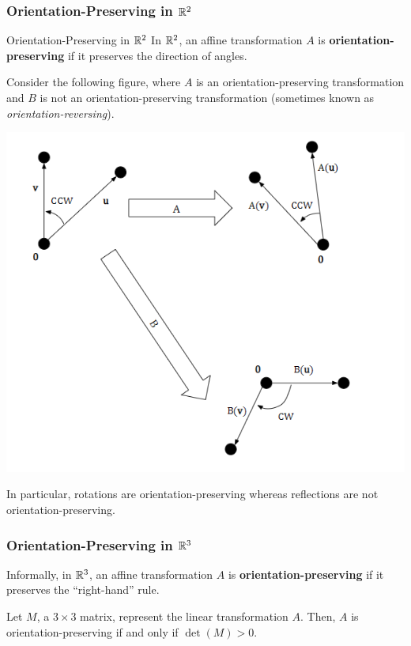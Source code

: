 \documentclass[letterpaper]{article}
\begin{document}
\subsubsection{Orientation-Preserving in \texorpdfstring{$\mathbb{R}^2$}{Two-Dimensions}}
\begin{definition}{Orientation-Preserving in $\mathbb{R}^2$}{}
    In $\mathbb{R}^2$, an affine transformation $A$ is \textbf{orientation-preserving} if it preserves the direction of angles. 
\end{definition}
Consider the following figure, where $A$ is an orientation-preserving transformation and $B$ is not an orientation-preserving transformation (sometimes known as \emph{orientation-reversing}).
\begin{center}
    \includegraphics[scale=0.8]{../assets/orientation.png}
\end{center}
In particular, rotations are orientation-preserving whereas reflections are not orientation-preserving.

\subsubsection{Orientation-Preserving in \texorpdfstring{$\mathbb{R}^3$}{Three-Dimensions}}
Informally, in $\mathbb{R}^3$, an affine transformation $A$ is \textbf{orientation-preserving} if it preserves the ``right-hand'' rule.
\begin{theorem}{}{}
    Let $M$, a $3 \times 3$ matrix, represent the linear transformation $A$. Then, $A$ is orientation-preserving if and only if $\det(M) > 0$. 
\end{theorem}
\end{document}
